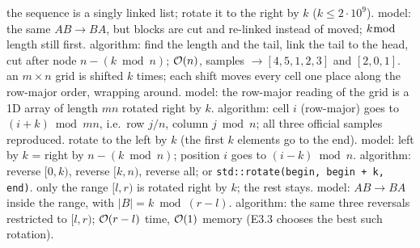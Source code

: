 \begin{variantsbox}
  {the sequence is a singly linked list; rotate it to the right by $k$ ($k \le 2\cdot10^9$).}
  {model: the same $AB \to BA$, but blocks are cut and re-linked instead of moved; $k \bmod$ length still first.}
  {algorithm: find the length and the tail, link the tail to the head, cut after node $n - (k \bmod n)$; $\mathcal{O}(n)$, samples $\to [4,5,1,2,3]$ and $[2,0,1]$.}
  {an $m \times n$ grid is shifted $k$ times; each shift moves every cell one place along the row-major order, wrapping around.}
  {model: the row-major reading of the grid is a 1D array of length $mn$ rotated right by $k$.}
  {algorithm: cell $i$ (row-major) goes to $(i + k) \bmod mn$, i.e.\ row $j / n$, column $j \bmod n$; all three official samples reproduced.}
  {rotate to the left by $k$ (the first $k$ elements go to the end).}
  {model: left by $k$ = right by $n - (k \bmod n)$; position $i$ goes to $(i - k) \bmod n$.}
  {algorithm: reverse $[0,k)$, reverse $[k,n)$, reverse all; or \texttt{std::rotate(begin, begin + k, end)}.}
  {only the range $[l, r)$ is rotated right by $k$; the rest stays.}
  {model: $AB \to BA$ inside the range, with $|B| = k \bmod (r - l)$.}
  {algorithm: the same three reversals restricted to $[l, r)$; $\mathcal{O}(r - l)$ time, $\mathcal{O}(1)$ memory (E3.3 chooses the best such rotation).}
\end{variantsbox}
